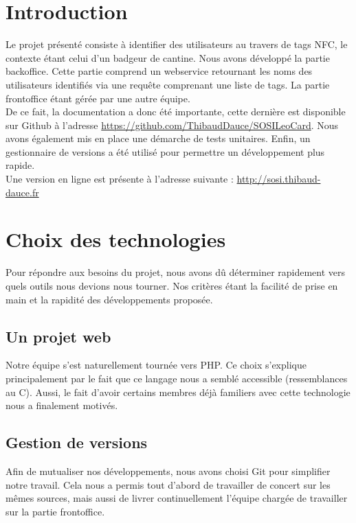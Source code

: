 \chapter*{Introduction}

Le projet présenté consiste à identifier des utilisateurs au travers de tags NFC, le
contexte étant celui d'un badgeur de cantine. Nous avons développé la partie backoffice.
Cette partie comprend un webservice retournant les noms des utilisateurs identifiés via
une requête comprenant une liste de tags. La partie frontoffice étant gérée par une autre équipe.\\

De ce fait, la documentation a donc été importante, cette dernière est disponible sur Github à l'adresse \url{https://github.com/ThibaudDauce/SOSILeoCard}. Nous avons également mis en place une démarche de tests unitaires. Enfin, un gestionnaire de versions a été utilisé pour permettre un développement plus rapide.\\

Une version en ligne est présente à l'adresse suivante : \url{http://sosi.thibaud-dauce.fr}

\chapter{Choix des technologies}

Pour répondre aux besoins du projet, nous avons dû déterminer rapidement vers quels outils
nous devions nous tourner. Nos critères étant la facilité de prise en main et la rapidité
des développements proposée.

\section{Un projet web}

Notre équipe s'est naturellement tournée vers PHP. Ce choix s'explique principalement par le fait
que ce langage nous a semblé accessible (ressemblances au C). Aussi, le fait d'avoir certains
membres déjà familiers avec cette technologie nous a finalement motivés.

\section{Gestion de versions}

Afin de mutualiser nos développements, nous avons choisi Git pour simplifier notre
travail. Cela nous a permis tout d'abord de travailler de concert sur les mêmes sources,
mais aussi de livrer continuellement l'équipe chargée de travailler sur la partie frontoffice.

